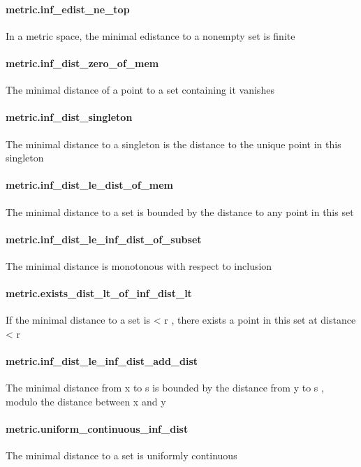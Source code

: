 \documentclass{article}
\begin{document}
\paragraph{metric.inf\_edist\_ne\_top}
\par
In a metric space, the minimal edistance to a nonempty set is finite
\paragraph{metric.inf\_dist\_zero\_of\_mem}
\par
The minimal distance of a point to a set containing it vanishes
\paragraph{metric.inf\_dist\_singleton}
\par
The minimal distance to a singleton is the distance to the unique point in this singleton
\paragraph{metric.inf\_dist\_le\_dist\_of\_mem}
\par
The minimal distance to a set is bounded by the distance to any point in this set
\paragraph{metric.inf\_dist\_le\_inf\_dist\_of\_subset}
\par
The minimal distance is monotonous with respect to inclusion
\paragraph{metric.exists\_dist\_lt\_of\_inf\_dist\_lt}
\par
If the minimal distance to a set is 
\colorbox[RGB]{253,246,227}{{{{\color[RGB]{181, 137, 0} < }}}{{{\color[RGB]{101, 123, 131} r }}}}, there exists a point in this set at distance 
\colorbox[RGB]{253,246,227}{{{{\color[RGB]{181, 137, 0} < }}}{{{\color[RGB]{101, 123, 131} r }}}}\paragraph{metric.inf\_dist\_le\_inf\_dist\_add\_dist}
\par
The minimal distance from 
\colorbox[RGB]{253,246,227}{{{{\color[RGB]{101, 123, 131} x }}}} to 
\colorbox[RGB]{253,246,227}{{{{\color[RGB]{101, 123, 131} s }}}} is bounded by the distance from 
\colorbox[RGB]{253,246,227}{{{{\color[RGB]{101, 123, 131} y }}}} to 
\colorbox[RGB]{253,246,227}{{{{\color[RGB]{101, 123, 131} s }}}}, modulo
the distance between 
\colorbox[RGB]{253,246,227}{{{{\color[RGB]{101, 123, 131} x }}}} and 
\colorbox[RGB]{253,246,227}{{{{\color[RGB]{101, 123, 131} y }}}}\paragraph{metric.uniform\_continuous\_inf\_dist}
\par
The minimal distance to a set is uniformly continuous
\end{document}
